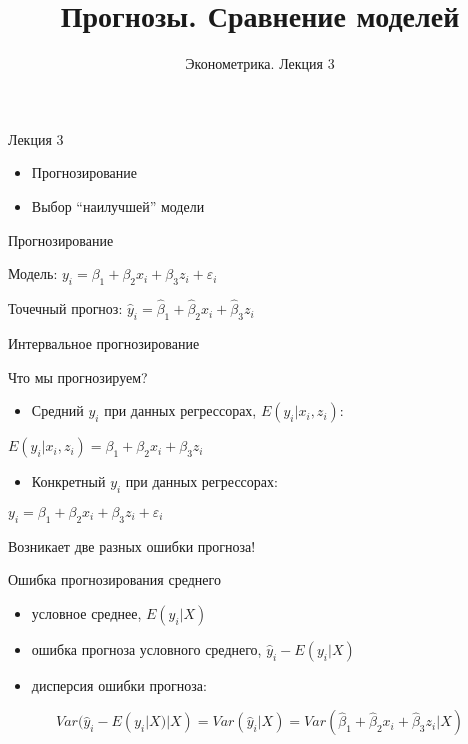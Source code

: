\documentclass[russian,ignorenonframetext,]{beamer}
\author[Эконометрика. Лекция 3]{Эконометрика. Лекция 3}
\title{Прогнозы. Сравнение моделей}
\date{}
\providecommand{\tightlist}{%
  \setlength{\itemsep}{0pt}\setlength{\parskip}{0pt}}
\newcommand{\hy}{\hat{y}}
\begin{document}
\frame{\titlepage}

\begin{frame}{Лекция 3}

\begin{itemize}
\item
  Прогнозирование
\item
  Выбор ``наилучшей'' модели
\end{itemize}

\end{frame}

\begin{frame}{Прогнозирование}

Модель: \(y_i = \beta_1 + \beta_2 x_i + \beta_3 z_i + \varepsilon_i\)

Точечный прогноз:
\(\hat{y}_i = \hat{\beta}_1 +\hat{\beta}_2 x_i + \hat{\beta}_3 z_i\)

\end{frame}

\begin{frame}{Интервальное прогнозирование}

Что мы прогнозируем?

\begin{itemize}
\tightlist
\item
  Средний \(y_i\) при данных регрессорах, \(E(y_i | x_i, z_i)\):
\end{itemize}

\(E(y_i | x_i, z_i)=\beta_1 + \beta_2 x_i + \beta_3 z_i\)

\begin{itemize}
\tightlist
\item
  Конкретный \(y_i\) при данных регрессорах:
\end{itemize}

\(y_i= \beta_1 + \beta_2 x_i + \beta_3 z_i + \varepsilon_i\)

Возникает две разных ошибки прогноза!

\end{frame}

\begin{frame}{Ошибка прогнозирования среднего}

\begin{itemize}
\item
  условное среднее, \(E(y_i | X)\)
\item
  ошибка прогноза условного среднего, \(\hat{y}_i - E(y_i | X)\)
\item
  дисперсия ошибки прогноза:
\end{itemize}

\[
Var(\hy_i - E(y_i | X)  | X )=Var(\hat{y}_i | X)  =Var(\hat{\beta}_1 +\hat{\beta}_2 x_i + \hat{\beta}_3 z_i | X)
\]

\end{frame}
\end{document}
